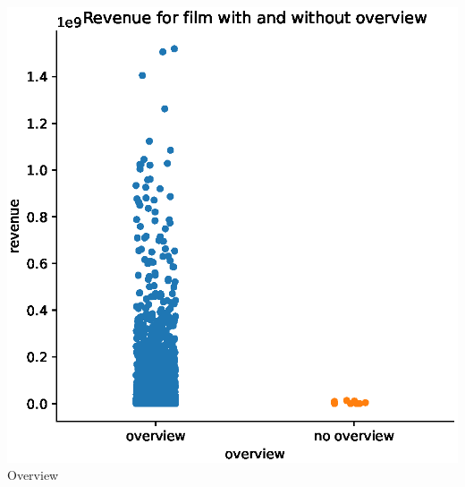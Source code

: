 \begin{center}
\begin{minipage}{0.3\linewidth}
  \centering
    \includegraphics[width=0.8\linewidth]{figures//overview.eps}
  {\small{Overview}}
  \end{minipage}
\end{center}

